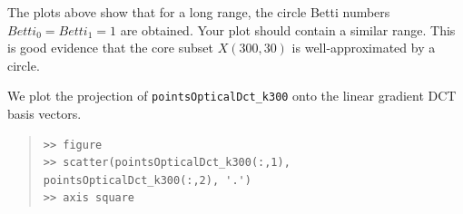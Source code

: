 \documentclass[amscd, amssymb, verbatim]{amsart}[12pt]
\theoremstyle{remark}
\theoremstyle{remark}
\theoremstyle{remark}
\begin{document}
The plots above show that for a long range, the circle Betti numbers $Betti_0 = Betti_1 = 1$ are obtained. Your plot should contain a similar range. This is good evidence that the core subset $X(300,30)$ is well-approximated by a circle. 

We plot the projection of \texttt{pointsOpticalDct\_k300} onto the linear gradient DCT basis vectors.

\begin{quote} \begin{verbatim}
>> figure
>> scatter(pointsOpticalDct_k300(:,1), pointsOpticalDct_k300(:,2), '.')
>> axis square
\end{verbatim} \end{quote}

\begin{figure}[htp]
  \begin{center}
    \quad
   \end{center}
\end{figure}
\FloatBarrier
\end{document}
